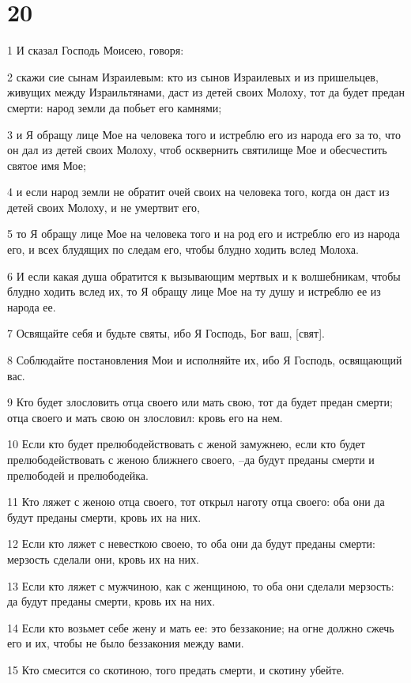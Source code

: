 \chapter{20}

\par 1 И сказал Господь Моисею, говоря:
\par 2 скажи сие сынам Израилевым: кто из сынов Израилевых и из пришельцев, живущих между Израильтянами, даст из детей своих Молоху, тот да будет предан смерти: народ земли да побьет его камнями;
\par 3 и Я обращу лице Мое на человека того и истреблю его из народа его за то, что он дал из детей своих Молоху, чтоб осквернить святилище Мое и обесчестить святое имя Мое;
\par 4 и если народ земли не обратит очей своих на человека того, когда он даст из детей своих Молоху, и не умертвит его,
\par 5 то Я обращу лице Мое на человека того и на род его и истреблю его из народа его, и всех блудящих по следам его, чтобы блудно ходить вслед Молоха.
\par 6 И если какая душа обратится к вызывающим мертвых и к волшебникам, чтобы блудно ходить вслед их, то Я обращу лице Мое на ту душу и истреблю ее из народа ее.
\par 7 Освящайте себя и будьте святы, ибо Я Господь, Бог ваш, [свят].
\par 8 Соблюдайте постановления Мои и исполняйте их, ибо Я Господь, освящающий вас.
\par 9 Кто будет злословить отца своего или мать свою, тот да будет предан смерти; отца своего и мать свою он злословил: кровь его на нем.
\par 10 Если кто будет прелюбодействовать с женой замужнею, если кто будет прелюбодействовать с женою ближнего своего, --да будут преданы смерти и прелюбодей и прелюбодейка.
\par 11 Кто ляжет с женою отца своего, тот открыл наготу отца своего: оба они да будут преданы смерти, кровь их на них.
\par 12 Если кто ляжет с невесткою своею, то оба они да будут преданы смерти: мерзость сделали они, кровь их на них.
\par 13 Если кто ляжет с мужчиною, как с женщиною, то оба они сделали мерзость: да будут преданы смерти, кровь их на них.
\par 14 Если кто возьмет себе жену и мать ее: это беззаконие; на огне должно сжечь его и их, чтобы не было беззакония между вами.
\par 15 Кто смесится со скотиною, того предать смерти, и скотину убейте.
